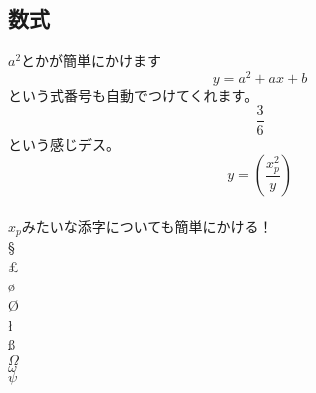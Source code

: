 \documentclass{jarticle}
\begin{document}
\begin{multicols}{2}
\section{数式}
$a^{2}$とかが簡単にかけます\\
\begin{equation}
y=a^2+ax+b
\end{equation}
という式番号も自動でつけてくれます。\\
\begin{equation}
\frac{3}{6}
\end{equation}
という感じデス。
\[
y=\left(\frac{x^2_p}{y}\right)
\]\\
$x_{p}$みたいな添字についても簡単にかける！\\
\S\\
\pounds\\
\o\\
\O\\
\l\\
\ss\\
$\Omega$\\
$\omega$\\
$\psi$\\
\end{multicols}
\end{document}

